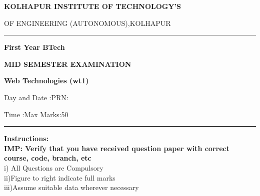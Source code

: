 \documentclass[12pt]{article}
\begin{document}
	\centering\bf{KOLHAPUR INSTITUTE OF TECHNOLOGY'S}\par
	\bfCOLLEGE OF ENGINEERING (AUTONOMOUS),KOLHAPUR
	\par\noindent\rule{\textwidth}{0.4pt}
	
	\centering\bf{First Year BTech}\par
	\centering\bf{MID SEMESTER EXAMINATION}\par
	\centering\bf{Web Technologies (wt1)}\par
	\begin{flushleft}
		Day and Date :{}\hspace{5.5cm}PRN:
	\end{flushleft}
	
	\begin{flushleft}
		Time :{}\hspace{7cm}Max Marks:{50}\\
	\end{flushleft}
	\noindent\rule{\textwidth}{0.1pt}
\begin{flushleft}
	{\bf Instructions:}\\
	{\hspace{0.5cm} \bf IMP: Verify that you have received question paper with correct course, code, branch, etc}\\
	\hspace{1cm}i) All Questions are Compulsory\\
	\hspace{1cm}ii)Figure to right indicate full marks\\
	\hspace{1cm}iii)Assume suitable data wherever necessary\\
\end{flushleft}
\end{document}
